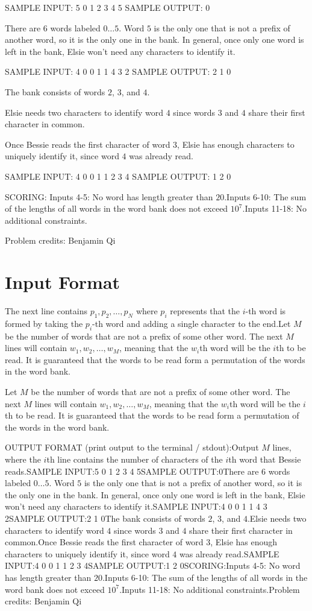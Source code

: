 \documentclass[12pt]{article}
\begin{document}
SAMPLE INPUT:
5
0 1 2 3 4
5
SAMPLE OUTPUT: 
0

There are $6$ words labeled $0\dots 5$. Word $5$ is the only one that is not  a
prefix of another word, so it is the only one in the bank. In general, once only
one word is left in the bank, Elsie won't need any characters to identify it.

SAMPLE INPUT:
4
0 0 1 1
4
3
2
SAMPLE OUTPUT: 
2
1
0

The bank consists of words $2$, $3$, and $4$.

Elsie needs two characters to identify word $4$ since words $3$ and $4$ share
their first character in common.

Once Bessie reads the first character of word $3$, Elsie has enough characters
to uniquely identify it, since word $4$ was already read.

SAMPLE INPUT:
4
0 0 1 1
2
3
4
SAMPLE OUTPUT: 
1
2
0

SCORING:
Inputs 4-5: No word has length greater than $20$.Inputs 6-10: The sum of the lengths of all words in the word bank does not
exceed
$10^7$.Inputs 11-18: No additional constraints.


Problem credits: Benjamin Qi



\section*{Input Format}
The next line contains $p_1,p_2,\dots,p_N$ where $p_i$ represents that the
$i$-th word is formed by taking the $p_i$-th word and adding a single character
to the end.Let $M$ be the number of words that are not a prefix of some other word. The
next $M$ lines will contain $w_1,w_2,\dots,w_M$, meaning that the $w_i$th word
will be the $i$th to be read. It is guaranteed that the  words to be read form a
permutation of the words in the word bank.

Let $M$ be the number of words that are not a prefix of some other word. The
next $M$ lines will contain $w_1,w_2,\dots,w_M$, meaning that the $w_i$th word
will be the $i$th to be read. It is guaranteed that the  words to be read form a
permutation of the words in the word bank.

OUTPUT FORMAT (print output to the terminal / stdout):Output $M$ lines, where the $i$th line contains the number of characters of the 
$i$th word that Bessie reads.SAMPLE INPUT:5
0 1 2 3 4
5SAMPLE OUTPUT:0There are $6$ words labeled $0\dots 5$. Word $5$ is the only one that is not  a
prefix of another word, so it is the only one in the bank. In general, once only
one word is left in the bank, Elsie won't need any characters to identify it.SAMPLE INPUT:4
0 0 1 1
4
3
2SAMPLE OUTPUT:2
1
0The bank consists of words $2$, $3$, and $4$.Elsie needs two characters to identify word $4$ since words $3$ and $4$ share
their first character in common.Once Bessie reads the first character of word $3$, Elsie has enough characters
to uniquely identify it, since word $4$ was already read.SAMPLE INPUT:4
0 0 1 1
2
3
4SAMPLE OUTPUT:1
2
0SCORING:Inputs 4-5: No word has length greater than $20$.Inputs 6-10: The sum of the lengths of all words in the word bank does not
exceed
$10^7$.Inputs 11-18: No additional constraints.Problem credits: Benjamin Qi
\end{document}
